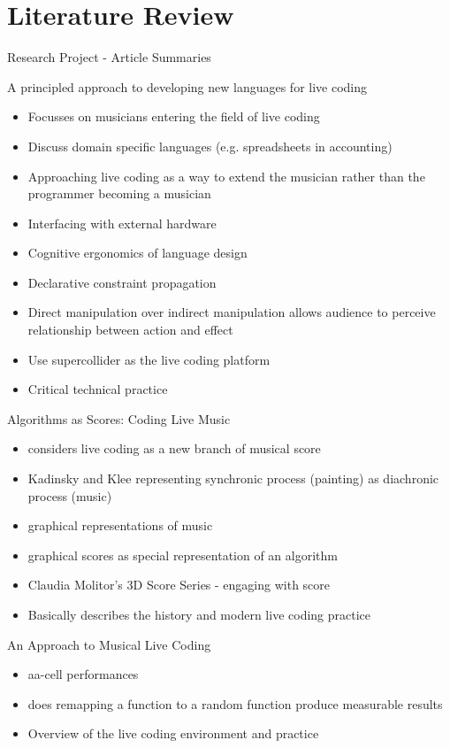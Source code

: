 
\chapter{Literature Review}
\label{cha:literaturereview}

Research Project - Article Summaries

A principled approach to developing new languages for live coding
\begin{itemize}
\item Focusses on musicians entering the field of live coding
\item Discuss domain specific languages (e.g. spreadsheets in accounting)
\item Approaching live coding as a way to extend the musician rather than the programmer becoming a musician
\item Interfacing with external hardware
\item Cognitive ergonomics of language design
\item Declarative constraint propagation
\item Direct manipulation over indirect manipulation allows audience to perceive relationship between action and effect
\item Use supercollider as the live coding platform
\item Critical technical practice
\end{itemize}

Algorithms as Scores: Coding Live Music
\begin{itemize}
\item considers live coding as a new branch of musical score
\item Kadinsky and Klee representing synchronic process (painting) as diachronic process (music)
\item graphical representations of music
\item graphical scores as special representation of an algorithm
\item Claudia Molitor’s 3D Score Series - engaging with score
\item Basically describes the history and modern live coding practice
\end{itemize}

An Approach to Musical Live Coding
\begin{itemize}
\item aa-cell performances
\item does remapping a function to a random function produce measurable results
\item Overview of the live coding environment and practice
\end{itemize}

